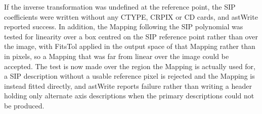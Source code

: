 \documentclass[twoside,11pt]{starlink}
\begin{document}
\begin{enumerate}
\begin{itemize}
    If the inverse transformation was undefined at the reference point, the SIP coefficients were written without any CTYPE, CRPIX or CD cards, and astWrite reported success.
    In addition, the Mapping following the SIP polynomial was tested for linearity over a box centred on the SIP reference point rather than over the image, with FitsTol applied in the output space of that Mapping rather than in pixels, so a Mapping that was far from linear over the image could be accepted.
    The test is now made over the region the Mapping is actually used for, a SIP description without a usable reference pixel is rejected and the Mapping is instead fitted directly, and astWrite reports failure rather than writing a header holding only alternate axis descriptions when the primary descriptions could not be produced.
  \end{itemize}


\end{enumerate}
\end{document}
